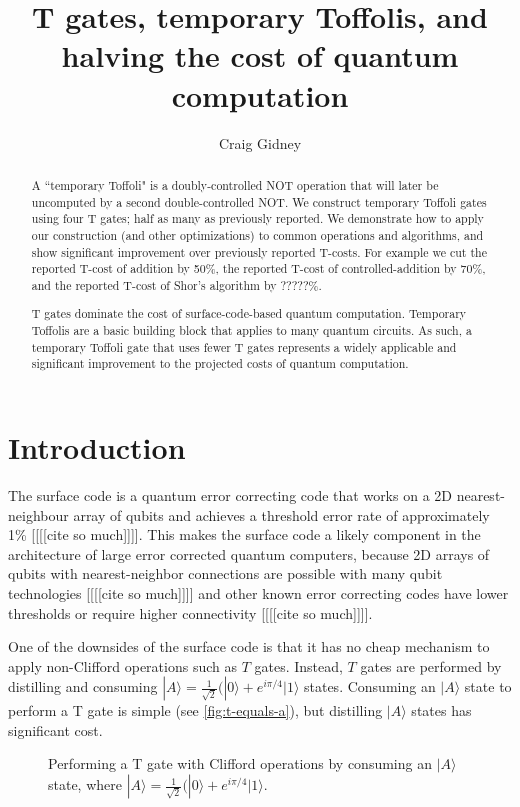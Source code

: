 \documentclass[twocolumn,longbibliography]{quantumarticle-customized}
\title{T gates, temporary Toffolis, and halving the cost of quantum computation}
\author{Craig Gidney}
\affiliation{Google, Santa Barbara, CA 93117, USA}
\newcommand{\qS}{\gate{S}}
\begin{document}
\maketitle

\begin{abstract}
A ``temporary Toffoli" is a doubly-controlled NOT operation that will later be uncomputed by a second double-controlled NOT.
We construct temporary Toffoli gates using four T gates; half as many as previously reported.
We demonstrate how to apply our construction (and other optimizations) to common operations and algorithms, and show significant improvement over previously reported T-costs.
For example we cut the reported T-cost of addition by 50\%, the reported T-cost of controlled-addition by 70\%, and the reported T-cost of Shor's algorithm by ?????\%.

T gates dominate the cost of surface-code-based quantum computation.
Temporary Toffolis are a basic building block that applies to many quantum circuits.
As such, a temporary Toffoli gate that uses fewer T gates represents a widely applicable and significant improvement to the projected costs of quantum computation.
\end{abstract}


\section{Introduction}
\label{sec:introduction}

The surface code is a quantum error correcting code that works on a 2D nearest-neighbour array of qubits and achieves a threshold error rate of approximately 1\% [[[[cite so much]]]].
This makes the surface code a likely component in the architecture of large error corrected quantum computers, because 2D arrays of qubits with nearest-neighbor connections are possible with many qubit technologies [[[[cite so much]]]] and other known error correcting codes have lower thresholds or require higher connectivity [[[[cite so much]]]].

One of the downsides of the surface code is that it has no cheap mechanism to apply non-Clifford operations such as $T$ gates.
Instead, $T$ gates are performed by distilling and consuming $|A\rangle = \frac{1}{\sqrt{2}} (|0\rangle + e^{i \pi/4} |1\rangle$ states.
Consuming an $|A\rangle$ state to perform a T gate is simple (see \autoref{fig:t-equals-a}), but distilling $|A\rangle$ states has significant cost.

\begin{figure}
  \resizebox{\linewidth}{!}{
    \Qcircuit @R=0.7em @C=0.7em {
      &\gate{T}&\qw &&=&&&          &&\qw &\ctrl{1}&\qw    &\qS            &\qw &\\
      &        &    && &&&|A\rangle &&\qw &\targ   &\meter &\cw\cwx\bullet &    &\\
    }
  }
  \caption{
	Performing a T gate with Clifford operations by consuming an $|A\rangle$ state, where $|A\rangle = \frac{1}{\sqrt{2}} (|0\rangle + e^{i \pi/4} |1\rangle$.
  }
  \label{fig:t-equals-a}
\end{figure}
\end{document}
